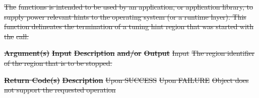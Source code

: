 \documentclass[12pt]{report} %
\providecommand{\DIFdeltex}[1]{{\protect\color{red}\sout{#1}}}                      %
\providecommand{\DIFdel}[1]{\texorpdfstring{\DIFdeltex{#1}}{}} %
\begin{document}
\DIFdel{The }%
\DIFdel{functions is intended to be used by an application, 
or application library, to supply power relevant hints to the operating system (or a runtime layer). 
This function delineates the termination of a tuning hint region that was started with the }%
\DIFdel{call.
}%


\textbf{\DIFdel{Argument(s)}} %
\textbf{\DIFdel{Input}}  %
\textbf{\DIFdel{Description}} %
\textbf{\DIFdel{and/or}}     %
\textbf{\DIFdel{Output}} %
\DIFdel{Input }%
\DIFdel{The region identifier of the region that is to be stopped. }%

\textbf{\DIFdel{Return Code(s)}} %
\textbf{\DIFdel{Description}} %
\DIFdel{Upon SUCCESS }%
\DIFdel{Upon FAILURE }%
\DIFdel{Object does not support the requested operation }%
\end{document}
